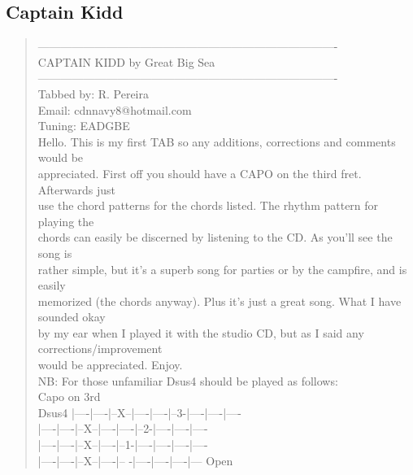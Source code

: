 \documentclass[11pt]{article}
\begin{document}
\subsection{Captain Kidd}
\label{sec:org9e30442}
\begin{verse}
-------------------------------------------------------------------------------\\
\hspace*{10em}CAPTAIN KIDD by Great Big Sea\\
-------------------------------------------------------------------------------\\
Tabbed by: R. Pereira\\
Email: cdnnavy8@hotmail.com\\
\vspace*{1em}
Tuning: EADGBE\\
\vspace*{1em}
Hello. This is my first TAB so any additions, corrections and comments would be\\
appreciated. First off you should have a CAPO on the third fret. Afterwards just\\
use the chord patterns for the chords listed. The rhythm pattern for playing the\\
chords can easily be discerned by listening to the CD. As you’ll see the song is\\
rather simple, but it’s a superb song for parties or by the campfire, and is easily\\
memorized (the chords anyway). Plus it’s just a great song. What I have sounded okay\\
by my ear when I played it with the studio CD, but as I said any corrections/improvement\\
would be appreciated. Enjoy.\\
\vspace*{1em}
NB: For those unfamiliar Dsus4 should be played as follows:\\
\hspace*{20em}Capo on 3rd\\
Dsus4   |----|----|--X--|----|----|--3-|----|----|----\\
\hspace*{8em}|----|----|--X--|----|----|--2-|----|----|----\\
\hspace*{8em}|----|----|--X--|----|--1-|----|----|----|----\\
\hspace*{8em}|----|----|--X--|----|-- -|----|----|----|---   Open\\

\end{verse}
\end{document}
